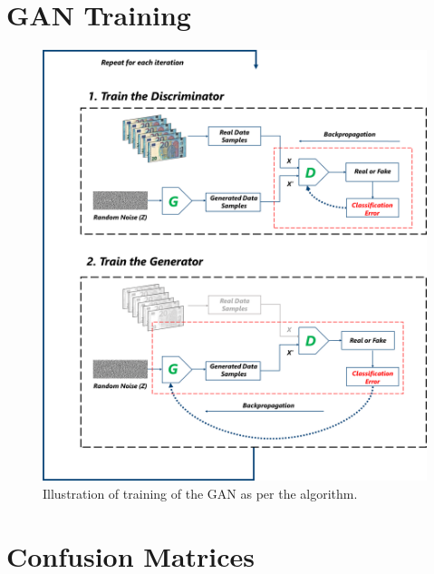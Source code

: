 \section{\ac{GAN} Training}
\vspace*{1.5cm}
\begin{figure}[H]
    \begin{center}
	\includegraphics[scale=0.25]{images/Appendix/generatorAndDiscriminatorTraining.png}
	\caption[Illustration of training of the \ac{GAN} as per the algorithm.]{Illustration of training of the \ac{GAN} as per the algorithm.}
	\label{fig:generatorAndDiscriminatorTraining}
	\end{center}
\end{figure}


\section{Confusion Matrices}


